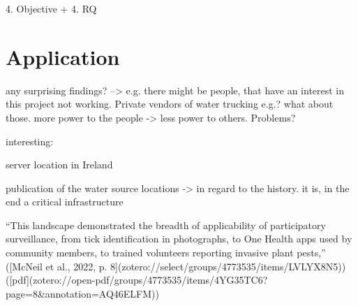 4. Objective + 4. RQ
\section{Application}


any surprising findings? 
--> e.g. there might be people, that have an interest in this project not working. Private vendors of water trucking e.g.? what about those.
more power to the people -> less power to others. Problems?

interesting: 

server location in Ireland

publication of the water source locations -> in regard to the history. it is, in the end a critical infrastructure

“This landscape demonstrated the breadth of applicability of participatory surveillance, from tick identification in photographs, to One Health apps used by community members, to trained volunteers reporting invasive plant pests,” ([McNeil et al., 2022, p. 8](zotero://select/groups/4773535/items/LVLYX8N5)) ([pdf](zotero://open-pdf/groups/4773535/items/4YG35TC6?page=8&annotation=AQ46ELFM))



